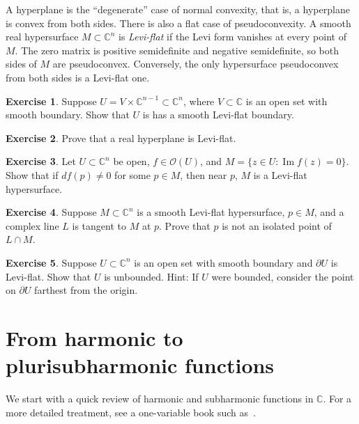 \documentclass[12pt,openany]{book}
\renewcommand{\Im}{\operatorname{Im}}
\newcommand{\C}{{\mathbb{C}}}
\newcommand{\sO}{{\mathscr{O}}}
\newcommand{\myindex}[1]{#1\index{#1}}
\theoremstyle{plain}
\theoremstyle{remark}
\theoremstyle{definition}
\newenvironment{exbox}{%
    \def\FrameCommand{\vrule width 1pt \relax\hspace{10pt}}%
    \MakeFramed{\advance\hsize-\width\FrameRestore}%
}{%
    \endMakeFramed
}
\theoremstyle{exercise}
\newtheorem{exercise}{Exercise}[section]
\theoremstyle{example}
\begin{document}
A hyperplane is the ``degenerate'' case of normal convexity,
that is, a hyperplane is convex from both sides.
There is also a flat case of pseudoconvexity.  A smooth real hypersurface
$M \subset \C^n$ is \emph{\myindex{Levi-flat}} if the Levi form
vanishes at every point of $M$.  The zero matrix is positive semidefinite
and negative semidefinite, so both sides of $M$ are pseudoconvex.
Conversely, the only hypersurface pseudoconvex from both sides is a
Levi-flat one.

\begin{exbox}
\begin{exercise}
Suppose $U = V \times \C^{n-1} \subset \C^n$, where $V \subset \C$ is an
open set with smooth boundary.  Show that $U$ is has a smooth Levi-flat boundary.
\end{exercise}

\begin{exercise}
Prove that a real hyperplane is Levi-flat.
\end{exercise}

\begin{exercise}
Let $U \subset \C^n$ be open, $f \in \sO(U)$, and
$M = \bigl\{ z \in U : \Im f(z) = 0 \bigr\}$.  Show that
if $df(p) \not=0$ for some $p \in M$, then near $p$,
$M$ is a Levi-flat hypersurface.
\end{exercise}


\begin{exercise}
Suppose $M \subset \C^n$ is a smooth Levi-flat hypersurface,
$p \in M$, and
a complex line $L$ is tangent to $M$ at $p$.
Prove that $p$ is not an isolated point of $L \cap M$.
\end{exercise}

\begin{exercise}
Suppose $U \subset \C^n$ is an open set with smooth boundary
and $\partial U$ is Levi-flat.
Show that $U$ is unbounded.
Hint: If $U$ were bounded, consider the point on $\partial U$ farthest from
the origin.
\end{exercise}
\end{exbox}


\section{From harmonic to plurisubharmonic functions}
\label{sec:harmonic}

We start with a quick review of harmonic and subharmonic functions in $\C$.
For a more detailed treatment, see a one-variable book such as~\cite{Lebl:ca}.
\end{document}
